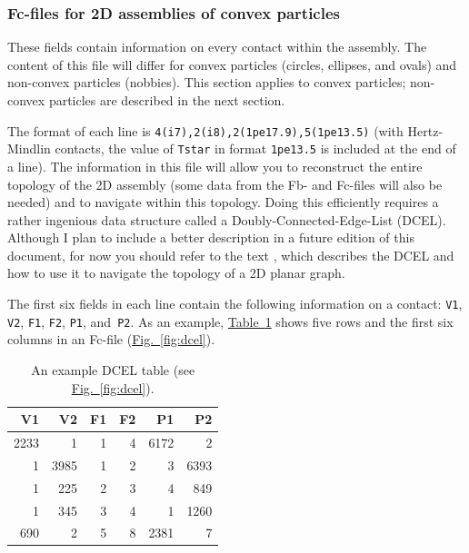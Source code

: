 \documentclass[letterpaper,11pt]{article}
\begin{document}
\subsubsection{Fc-files for 2D assemblies of convex particles}\label{sec:f3files}
These fields contain information on every contact within the assembly.
The content of this file will differ for convex particles (circles,
ellipses, and ovals) and non-convex particles (nobbies).
This section applies to convex particles; non-convex particles
are described in the next section.
\par
The format of each line is \texttt{4(i7),2(i8),2(1pe17.9),5(1pe13.5)}
(with Hertz-Mindlin contacts, the value of \texttt{Tstar} in 
format \texttt{1pe13.5} is included at the end of a line).
The information in this file will allow you to reconstruct the
entire topology of the 2D assembly (some data from the Fb- and Fc-files
will also be needed) and to navigate within this topology.
Doing this efficiently requires a rather ingenious
data structure called a Doubly-Connected-Edge-List
(DCEL).
Although I plan to include a better description in a future edition 
of this document,
for now you should refer to the text \citep{Preparata:1985a},
which describes the DCEL and how to use it to navigate 
the topology of a 2D planar graph.
\par
The first six fields in each line contain the following information
on a contact:
\texttt{V1}, \texttt{V2}, \texttt{F1}, \texttt{F2}, \texttt{P1},
and~\texttt{P2}.
As an example,
\hyperref[table:dcel]{Table~\ref*{table:dcel}}
shows five rows 
and the first six columns in an Fc-file
(\hyperref[fig:dcel]{Fig.~\ref*{fig:dcel}}).
\begin{table}
\centering
\begin{tabular}{rrrrrr}
\hline
\hline
V1 & V2 & F1 & F2 & P1 & P2 \\
\hline
2233 &    1 & 1 &  4 & 6172 &    2 \\
   1 & 3985 & 1 &  2 &    3 & 6393 \\
   1 &  225 & 2 &  3 &    4 &  849 \\
   1 &  345 & 3 &  4 &    1 & 1260 \\
 690 &    2 & 5 &  8 & 2381 &    7 \\
\hline
\hline
\end{tabular}
\caption{An example DCEL table
	(see \hyperref[fig:dcel]{Fig.~\ref*{fig:dcel}}).}
\label{table:dcel}
\end{table}
%
\end{document}
